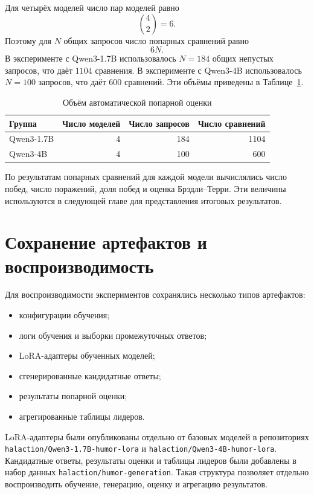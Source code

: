 Для четырёх моделей число пар моделей равно
\[
    {4 \choose 2}=6.
\]
Поэтому для \(N\) общих запросов число попарных сравнений равно
\[
    6N.
\]
В эксперименте с Qwen3-1.7B использовалось \(N=184\) общих непустых запросов, что даёт \(1104\) сравнения. В эксперименте с Qwen3-4B использовалось \(N=100\) запросов, что даёт \(600\) сравнений. Эти объёмы приведены в Таблице~\ref{tab:evaluation-volume}.

\begin{table}[h]
    \centering
    \caption{Объём автоматической попарной оценки}
    \label{tab:evaluation-volume}
    \begin{tabular}{lrrr}
        \hline
        Группа     & Число моделей & Число запросов & Число сравнений \\
        \hline
        Qwen3-1.7B & 4             & 184            & 1104            \\
        Qwen3-4B   & 4             & 100            & 600             \\
        \hline
    \end{tabular}
\end{table}

По результатам попарных сравнений для каждой модели вычислялись число побед, число поражений, доля побед и оценка Брэдли--Терри. Эти величины используются в следующей главе для представления итоговых результатов.

\section{Сохранение артефактов и воспроизводимость}

Для воспроизводимости экспериментов сохранялись несколько типов артефактов:
\begin{itemize}
    \item конфигурации обучения;
    \item логи обучения и выборки промежуточных ответов;
    \item LoRA-адаптеры обученных моделей;
    \item сгенерированные кандидатные ответы;
    \item результаты попарной оценки;
    \item агрегированные таблицы лидеров.
\end{itemize}

LoRA-адаптеры были опубликованы отдельно от базовых моделей в репозиториях \texttt{halaction/Qwen3-1.7B-humor-lora} и \texttt{halaction/Qwen3-4B-humor-lora}. Кандидатные ответы, результаты оценки и таблицы лидеров были добавлены в набор данных \texttt{halaction/humor-generation}. Такая структура позволяет отдельно воспроизводить обучение, генерацию, оценку и агрегацию результатов.
